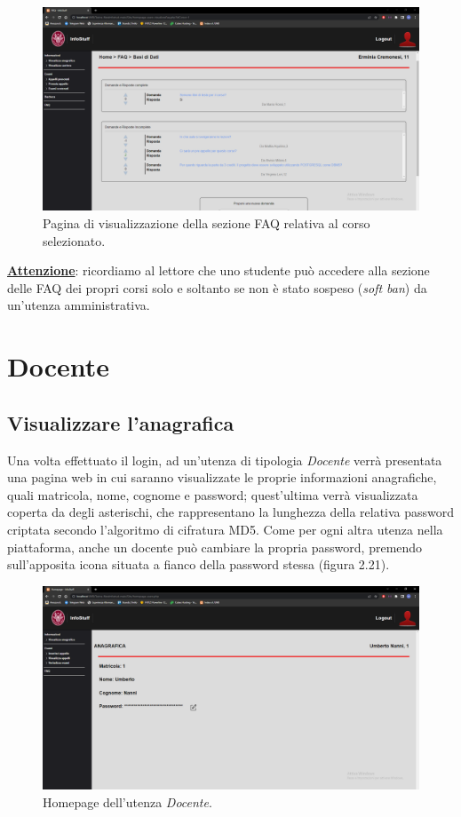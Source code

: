 \documentclass [a4paper,11pt]{book}
\begin{document}
\begin{figure}
\centering
\includegraphics[scale=0.3]{figura2-20.png}
\caption{Pagina di visualizzazione della sezione FAQ relativa al corso selezionato.}
\end{figure}

\medskip

\textbf{\underline{Attenzione}}: ricordiamo al lettore che uno studente può accedere alla sezione delle FAQ dei propri corsi solo e soltanto se non è stato sospeso (\emph{soft ban}) da un'utenza amministrativa.

\medskip
\medskip

\section{Docente}

\subsection{Visualizzare l'anagrafica}

Una volta effettuato il login, ad un'utenza di tipologia \emph{Docente} verrà presentata una pagina web in cui saranno visualizzate le proprie informazioni anagrafiche, quali matricola, nome, cognome e password; quest'ultima verrà visualizzata coperta da degli asterischi, che rappresentano la lunghezza della relativa password criptata secondo l'algoritmo di cifratura MD5. Come per ogni altra utenza nella piattaforma, anche un docente può cambiare la propria password, premendo sull'apposita icona situata a fianco della password stessa (figura 2.21). 

\begin{figure}
\centering
\includegraphics[scale=0.3]{figura2-21.png}
\caption{Homepage dell'utenza \emph{Docente}.}
\end{figure}
\end{document}
